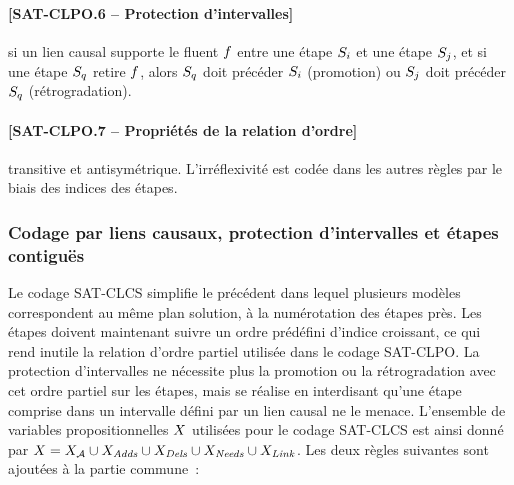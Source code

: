 \paragraph*{[SAT-CLPO.6 -- Protection d'intervalles]} si un lien causal supporte le
  fluent $f$ entre une étape $S_{i}$ et une étape $S_{j}$, et si une étape $S_{q}$
  retire $f$, alors $S_{q}$ doit précéder $S_{i}$ (promotion) ou $S_{j}$ doit précéder
  $S_{q}$ (rétrogradation).
\paragraph*{[SAT-CLPO.7 -- Propriétés de la relation d'ordre]} transitive et
  antisymétrique. L'irréflexivité est codée dans les autres règles par le biais
  des indices des étapes.


\subsubsection{Codage par liens causaux, protection d'intervalles et étapes contiguës}

Le codage SAT-CLCS simplifie le précédent dans lequel plusieurs modèles correspondent au même plan solution, à la numérotation des étapes près. Les étapes doivent maintenant suivre un ordre prédéfini d'indice croissant, ce qui rend inutile la relation d'ordre partiel utilisée dans le codage SAT-CLPO. La protection d'intervalles ne nécessite plus la promotion ou la rétrogradation avec cet ordre partiel sur les étapes, mais se
réalise en interdisant qu'une étape comprise dans un intervalle défini par un lien causal ne le menace.
L'ensemble de variables propositionnelles $X$ utilisées pour le codage SAT-CLCS est ainsi donné par $X = X_{\mathcal{A}} \cup X_{\mathit{Adds}}\cup X_{\mathit{Dels}}\cup X_{\mathit{Needs}} \cup X_{\mathit{Link}}$.
Les deux règles suivantes sont ajoutées à la partie commune~:

